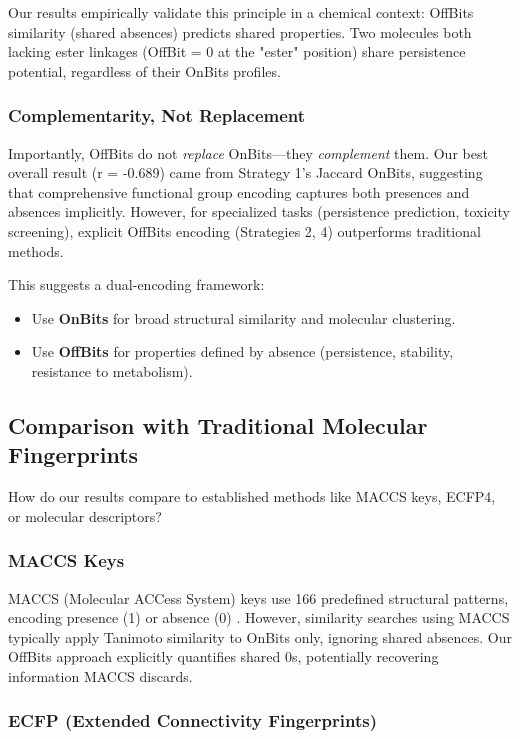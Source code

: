 \documentclass[11pt,letterpaper]{article}
\begin{document}
Our results empirically validate this principle in a chemical context: OffBits similarity (shared absences) predicts shared properties. Two molecules both lacking ester linkages (OffBit = 0 at the "ester" position) share persistence potential, regardless of their OnBits profiles.

\subsubsection{Complementarity, Not Replacement}

Importantly, OffBits do not \textit{replace} OnBits—they \textit{complement} them. Our best overall result (r = -0.689) came from Strategy 1's Jaccard OnBits, suggesting that comprehensive functional group encoding captures both presences and absences implicitly. However, for specialized tasks (persistence prediction, toxicity screening), explicit OffBits encoding (Strategies 2, 4) outperforms traditional methods.

This suggests a dual-encoding framework:
\begin{itemize}
    \item Use \textbf{OnBits} for broad structural similarity and molecular clustering.
    \item Use \textbf{OffBits} for properties defined by absence (persistence, stability, resistance to metabolism).
\end{itemize}

\subsection{Comparison with Traditional Molecular Fingerprints}

How do our results compare to established methods like MACCS keys, ECFP4, or molecular descriptors?

\subsubsection{MACCS Keys}

MACCS (Molecular ACCess System) keys use 166 predefined structural patterns, encoding presence (1) or absence (0) \cite{durant2002reoptimization}. However, similarity searches using MACCS typically apply Tanimoto similarity to OnBits only, ignoring shared absences. Our OffBits approach explicitly quantifies shared 0s, potentially recovering information MACCS discards.

\subsubsection{ECFP (Extended Connectivity Fingerprints)}
\end{document}
